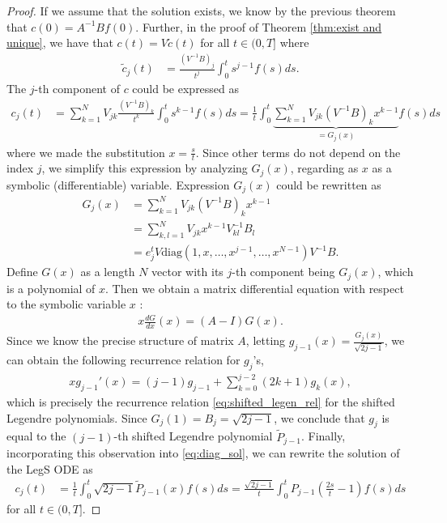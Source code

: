 \documentclass{article}
\theoremstyle{definition}
\newcommand{\pr}[1]{ \left( #1 \right) }
\begin{document}
\begin{proof}
    If we assume that the solution exists, we know by the previous theorem that $c(0) = A^{-1}B f(0)$. 
    Further, in the proof of Theorem \ref{thm:exist and unique}, we have that $c(t) = V\tilde{c}(t)$ for all $t \in (0,T]$ where
    \begin{align*}
        \tilde{c}_j(t) 
        &= \frac{\pr{V^{-1}B}_j}{t^j} \int_0^t s^{j-1}f(s)ds.
    \end{align*}
    The $j$-th component of $c$ could be expressed as 
    \begin{align}
        c_j(t) &= \sum_{k=1}^N V_{jk}
        \frac{\pr{V^{-1}B}_k}{t^k} \int_0^t s^{k-1}f(s)ds  %
        = \frac{1}{t} \int_0^t 
        \underbrace{{\sum_{k=1}^N V_{jk} \pr{V^{-1}B}_k x^{k-1}}}_{=G_j(x)}
        f(s)ds \label{eq:diag_sol}
    \end{align}
    where we made the substitution $x = \frac{s}{t}$. Since other terms do not depend on the index $j$, we simplify this expression by analyzing $G_j(x)$, regarding as $x$ as a symbolic (differentiable) variable. Expression $G_j(x)$ could be rewritten as 
    \begin{align*}
        G_j(x) &= \sum_{k=1}^N V_{jk} \pr{V^{-1}B}_k x^{k-1} \\
        &= \sum_{k,l=1}^N V_{jk} x^{k-1} V^{-1}_{kl} B_l \\
        &= e_j^t V \text{diag} \pr{1, x, \dots, x^{j-1}, \dots, x^{N-1}} V^{-1}B.
    \end{align*}
    Define $G(x)$ as a length $N$ vector with its $j$-th component being $G_j(x)$, which is a polynomial of $x$.
    Then we obtain a matrix differential equation with respect to the symbolic variable $x$ :
    \begin{align*}
        x \frac{dG}{dx}(x) = \pr{A-I} G(x).
    \end{align*}
    Since we know the precise structure of matrix $A$, letting $g_{j-1}(x) = \frac{G_j(x)}{\sqrt{2j-1}} $, we can obtain the following recurrence relation for $g_j$'s, 
    \begin{align*}
        xg_{j-1}'(x) = (j-1)g_{j-1} + \sum_{k=0}^{j-2}(2k+1)g_k(x),
    \end{align*}
    which is precisely the recurrence relation \eqref{eq:shifted_legen_rel} for the shifted Legendre polynomials. Since $G_j(1) = B_j = \sqrt{2j-1}$, we conclude that $g_j$ is equal to the $(j-1)$-th shifted Legendre polynomial $\tilde{P}_{j-1}$. 
    Finally, incorporating this observation into \eqref{eq:diag_sol}, we can rewrite the solution of the LegS ODE as 
    \begin{align*}
        c_j(t) &= \frac{1}{t}\int_0^t \sqrt{2j-1} \tilde{P}_{j-1}\pr{x} f(s)ds %
        = \frac{\sqrt{2j-1}}{t} \int_0^t P_{j-1} \pr{\frac{2s}{t}-1} f(s)ds
    \end{align*}
    for all $t \in (0, T]$.
\end{proof}
\end{document}
